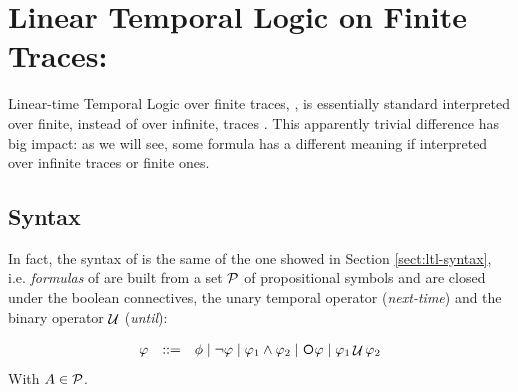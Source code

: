 %

\section{Linear Temporal Logic on Finite Traces: \LTLf}
\label{ltlf}
Linear-time Temporal Logic over finite traces, \LTLf, is essentially standard 
\LTL \citep{Pnueli:1977:TLP:1382431.1382534} interpreted over finite, instead of over infinite, traces \citep{de2013linear}.
This apparently trivial difference has big impact: as we will see, some \LTL formula has a different meaning if interpreted over infinite traces or finite ones.

\subsection{Syntax}\label{ltlf-syntax}
In fact, the syntax of \LTLf is the same of the one showed in Section \ref{sect:ltl-syntax}, i.e. \emph{formulas} of \LTLf are built from a set $\mathcal{P}$ of propositional symbols and are closed under the boolean connectives, the unary temporal operator \Next (\emph{next-time}) and the binary operator $\mathop{\mathcal{U}}$ (\emph{until}):

\[\begin{array}{rcl}
\varphi &::=& \phi \mid \lnot \varphi \mid \varphi_1\land \varphi_2 \mid \Next\varphi \mid \varphi_1 \lUntil \varphi_2
\end{array}
\]
With $A\in \mathcal{P}$.

